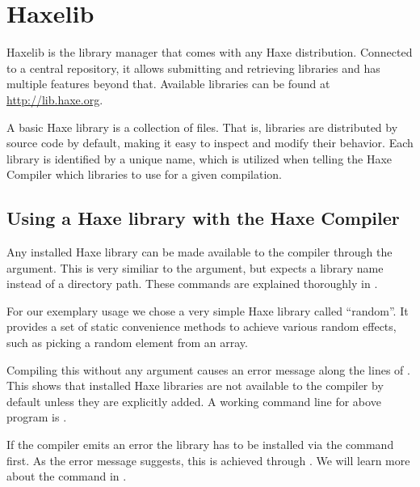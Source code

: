 \chapter{Haxelib}
\label{haxelib}

Haxelib is the library manager that comes with any Haxe distribution. Connected to a central repository, it allows submitting and retrieving libraries and has multiple features beyond that. Available libraries can be found at \url{http://lib.haxe.org}.

A basic Haxe library is a collection of  files. That is, libraries are distributed by source code by default, making it easy to inspect and modify their behavior. Each library is identified by a unique name, which is utilized when telling the Haxe Compiler which libraries to use for a given compilation.

\section{Using a Haxe library with the Haxe Compiler}
\label{haxelib-using-haxe}

Any installed Haxe library can be made available to the compiler through the  argument. This is very similiar to the  argument, but expects a library name instead of a directory path. These commands are explained thoroughly in .

For our exemplary usage we chose a very simple Haxe library called ``random''. It provides a set of static convenience methods to achieve various random effects, such as picking a random element from an array.


Compiling this without any  argument causes an error message along the lines of . This shows that installed Haxe libraries are not available to the compiler by default unless they are explicitly added. A working command line for above program is .

If the compiler emits an error  the library has to be installed via the  command first. As the error message suggests, this is achieved through . We will learn more about the  command in .



